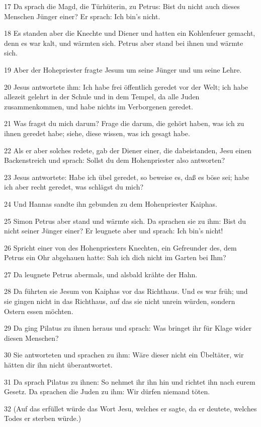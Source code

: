 \par 17 Da sprach die Magd, die Türhüterin, zu Petrus: Bist du nicht auch dieses Menschen Jünger einer? Er sprach: Ich bin's nicht.
\par 18 Es standen aber die Knechte und Diener und hatten ein Kohlenfeuer gemacht, denn es war kalt, und wärmten sich. Petrus aber stand bei ihnen und wärmte sich.
\par 19 Aber der Hohepriester fragte Jesum um seine Jünger und um seine Lehre.
\par 20 Jesus antwortete ihm: Ich habe frei öffentlich geredet vor der Welt; ich habe allezeit gelehrt in der Schule und in dem Tempel, da alle Juden zusammenkommen, und habe nichts im Verborgenen geredet.
\par 21 Was fragst du mich darum? Frage die darum, die gehört haben, was ich zu ihnen geredet habe; siehe, diese wissen, was ich gesagt habe.
\par 22 Als er aber solches redete, gab der Diener einer, die dabeistanden, Jesu einen Backenstreich und sprach: Sollst du dem Hohenpriester also antworten?
\par 23 Jesus antwortete: Habe ich übel geredet, so beweise es, daß es böse sei; habe ich aber recht geredet, was schlägst du mich?
\par 24 Und Hannas sandte ihn gebunden zu dem Hohenpriester Kaiphas.
\par 25 Simon Petrus aber stand und wärmte sich. Da sprachen sie zu ihm: Bist du nicht seiner Jünger einer? Er leugnete aber und sprach: Ich bin's nicht!
\par 26 Spricht einer von des Hohenpriesters Knechten, ein Gefreunder des, dem Petrus ein Ohr abgehauen hatte: Sah ich dich nicht im Garten bei Ihm?
\par 27 Da leugnete Petrus abermals, und alsbald krähte der Hahn.
\par 28 Da führten sie Jesum von Kaiphas vor das Richthaus. Und es war früh; und sie gingen nicht in das Richthaus, auf das sie nicht unrein würden, sondern Ostern essen möchten.
\par 29 Da ging Pilatus zu ihnen heraus und sprach: Was bringet ihr für Klage wider diesen Menschen?
\par 30 Sie antworteten und sprachen zu ihm: Wäre dieser nicht ein Übeltäter, wir hätten dir ihn nicht überantwortet.
\par 31 Da sprach Pilatus zu ihnen: So nehmet ihr ihn hin und richtet ihn nach eurem Gesetz. Da sprachen die Juden zu ihm: Wir dürfen niemand töten.
\par 32 (Auf das erfüllet würde das Wort Jesu, welches er sagte, da er deutete, welches Todes er sterben würde.)
